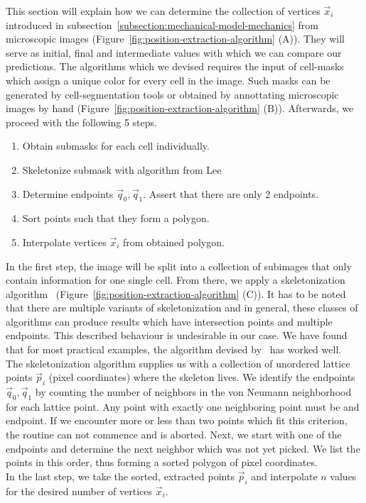 \documentclass{article}
\begin{document}
This section will explain how we can determine the collection of vertices $\vec{x}_i$ introduced in
subsection~\ref{subsection:mechanical-model-mechanics} from microscopic images
(Figure~\ref{fig:position-extraction-algorithm} (A)).
They will serve as initial, final and intermediate values with which we can compare our predictions.
The algorithms which we devised requires the input of cell-masks which assign a unique color for
every cell in the image.
Such masks can be generated by cell-segmentation tools or obtained by annottating microscopic images
by hand (Figure~\ref{fig:position-extraction-algorithm} (B)).
Afterwards, we proceed with the following 5 steps.
\begin{enumerate}
    \item Obtain submasks for each cell individually.
    \item Skeletonize submask with algorithm from Lee~\cite{Lee1994}
    \item Determine endpoints $\vec{q}_0,\vec{q}_1$.
        Assert that there are only 2 endpoints.
    \item Sort points such that they form a polygon.
    \item Interpolate vertices $\vec{x}_i$ from obtained polygon.
\end{enumerate}
In the first step, the image will be split into a collection of subimages that only contain
information for one single cell.
From there, we apply a skeletonization algorithm~\cite{Lee1994}
(Figure~\ref{fig:position-extraction-algorithm} (C)).
It has to be noted that there are multiple variants of skeletonization and in general, these classes
of algorithms can produce results which have intersection points and multiple endpoints.
This described behaviour is undesirable in our case.
We have found that for most practical examples, the algorithm devised by~\cite{Lee1994} has worked
well.\\
The skeletonization algorithm supplies us with a collection of unordered lattice points $\vec{p}_i$
(pixel coordinates) where the skeleton lives.
We identify the endpoints $\vec{q}_0,\vec{q}_1$ by counting the number of neighbors in the von
Neumann neighborhood for each lattice point.
Any point with exactly one neighboring point must be and endpoint.
If we encounter more or less than two points which fit this criterion, the routine can not commence
and is aborted.
Next, we start with one of the endpoints and determine the next neighbor which was not yet picked.
We list the points in this order, thus forming a sorted polygon of pixel coordinates.\\
In the last step, we take the sorted, extracted points $\vec{p}_i$ and interpolate $n$ values for
the desired number of vertices $\vec{x}_i$.
\end{document}
